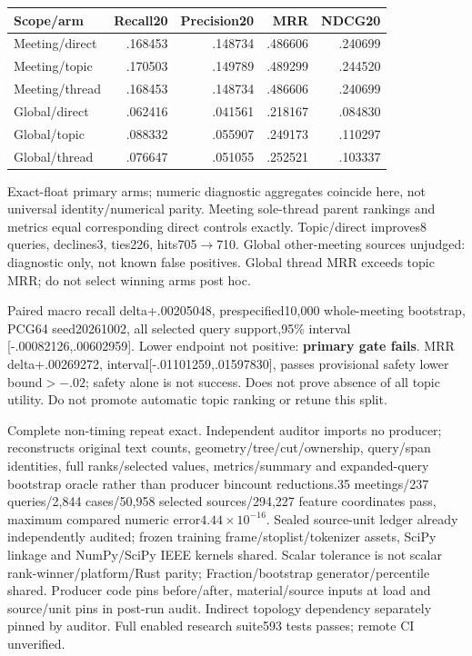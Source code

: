 \documentclass[11pt]{article}
\begin{document}
\begin{center}
\begin{tabular}{lrrrr}
Scope/arm & Recall20 & Precision20 & MRR & NDCG20\\\hline
Meeting/direct & .168453 & .148734 & .486606 & .240699\\
Meeting/topic & .170503 & .149789 & .489299 & .244520\\
Meeting/thread & .168453 & .148734 & .486606 & .240699\\
Global/direct & .062416 & .041561 & .218167 & .084830\\
Global/topic & .088332 & .055907 & .249173 & .110297\\
Global/thread & .076647 & .051055 & .252521 & .103337
\end{tabular}
\end{center}
Exact-float primary arms; numeric diagnostic aggregates coincide here, not
universal identity/numerical parity. Meeting sole-thread parent rankings and
metrics equal corresponding direct controls exactly. Topic/direct improves8
queries, declines3, ties226, hits705$\rightarrow$710. Global other-meeting
sources unjudged: diagnostic only, not known false positives. Global thread
MRR exceeds topic MRR; do not select winning arms post hoc.

Paired macro recall delta+.00205048, prespecified10,000 whole-meeting bootstrap,
PCG64 seed20261002, all selected query support,95\% interval
[-.00082126,.00602959]. Lower endpoint not positive: \textbf{primary gate fails}.
MRR delta+.00269272, interval[-.01101259,.01597830], passes provisional safety
lower bound$>-.02$; safety alone is not success. Does not prove absence of
all topic utility. Do not promote automatic topic ranking or retune this split.

Complete non-timing repeat exact. Independent auditor imports no producer;
reconstructs original text counts, geometry/tree/cut/ownership, query/span
identities, full ranks/selected values, metrics/summary and expanded-query
bootstrap oracle rather than producer bincount reductions.35 meetings/237
queries/2,844 cases/50,958 selected sources/294,227 feature coordinates pass,
maximum compared numeric error$4.44\times10^{-16}$. Sealed source-unit ledger
already independently audited; frozen training frame/stoplist/tokenizer assets,
SciPy linkage and NumPy/SciPy IEEE kernels shared. Scalar tolerance is not scalar
rank-winner/platform/Rust parity; Fraction/bootstrap generator/percentile shared.
Producer code pins before/after, material/source inputs at load and source/unit
pins in post-run audit. Indirect topology dependency separately pinned by auditor.
Full enabled research suite593 tests passes; remote CI unverified.
\end{document}
